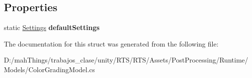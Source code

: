 \subsection*{Properties}
\begin{DoxyCompactItemize}
\item 
\mbox{\label{struct_unity_engine_1_1_post_processing_1_1_color_grading_model_1_1_settings_a56e20088ac2842af86cf031e7554b428}} 
static \mbox{\hyperlink{struct_unity_engine_1_1_post_processing_1_1_color_grading_model_1_1_settings}{Settings}} {\bfseries default\+Settings}
\end{DoxyCompactItemize}


The documentation for this struct was generated from the following file\+:\begin{DoxyCompactItemize}
\item 
D\+:/mah\+Things/trabajos\+\_\+clase/unity/\+R\+T\+S/\+R\+T\+S/\+Assets/\+Post\+Processing/\+Runtime/\+Models/Color\+Grading\+Model.\+cs\end{DoxyCompactItemize}
